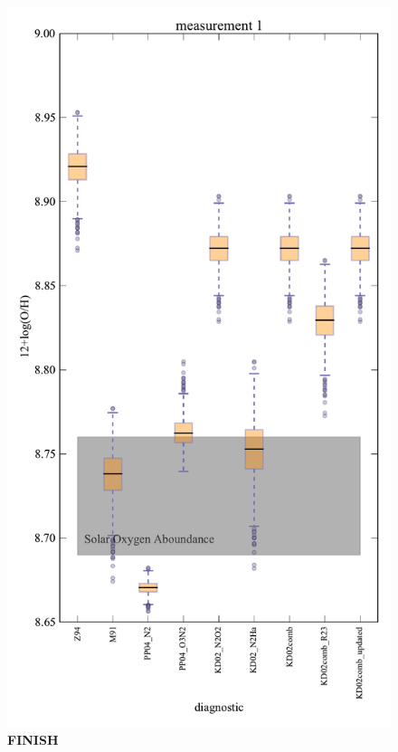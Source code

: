 \documentclass{emulateapj}
\begin{document}
\begin{figure}[ht!]
  \includegraphics[width=0.95\columnwidth]{exampledata_boxplot2000_m1.pdf}
   \caption{\textbf{FINISH}}
 \label{boxplot}
\end{figure}
\end{document}
